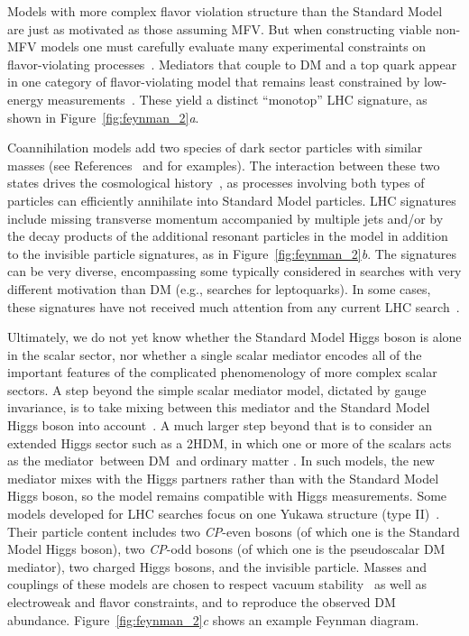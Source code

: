 \documentclass{ar-1col}
\newcommand{\IP}{invisible particle}
\begin{document}
{Models with more complex flavor violation structure than the Standard Model 
are just as motivated as those assuming MFV. 
But when constructing viable non-MFV models one must carefully evaluate 
many experimental constraints on flavor-violating processes~\cite{Blanke:2017tnb}. 
Mediators that couple to
DM and a top quark appear in one category of flavor-violating
model that remains least constrained by low-energy
measurements~\cite{Boucheneb:2014wza}. These yield a distinct
``monotop'' LHC signature, as shown in Figure~\ref{fig:feynman_2}\textit{a}.

{Coannihilation} models add two species of dark sector
particles with similar masses (see References~ and  for examples). 
The interaction between these two states drives the cosmological
history~\cite{Ellis:1999mm}, as processes involving both types of
particles can efficiently annihilate into Standard Model particles. LHC
signatures include missing transverse momentum accompanied by multiple jets
and/or by the decay products of the 
additional resonant particles in the model in addition to the invisible particle signatures,
as in Figure~\ref{fig:feynman_2}\textit{b}.
The signatures can be very diverse, encompassing some typically
considered in searches with very different motivation than DM (e.g., searches for
leptoquarks). In some cases, these signatures have not received much attention from any
current LHC search~\cite{Buschmann:2016hkc}.

Ultimately, we do not yet know whether the Standard Model Higgs boson is alone 
in the scalar sector, nor whether a single scalar mediator
encodes all of the important features of the complicated
phenomenology of more {complex scalar sectors}. 
A step beyond the simple scalar mediator model, dictated by gauge invariance, 
is to take mixing between this mediator and the Standard Model Higgs boson
into account~\cite{Bauer:2016gys,Berlin:2014cfa}. A much larger
step beyond that is to consider an extended Higgs sector such as a
2HDM, in which one or more of the scalars
acts as the mediator~between DM\ and ordinary matter \cite{Bauer:2017ota,Goncalves:2016iyg,Bell:2016ekl}. 
In such models, the new mediator mixes with the Higgs partners
rather than with the Standard Model Higgs boson, so the model remains
compatible with Higgs measurements. 
Some models developed for LHC searches focus on one Yukawa structure (type II)~\cite{Pich:2009sp}. 
Their particle content includes two \textit{CP}-even bosons (of which one is the Standard Model Higgs
boson), two \textit{CP}-odd bosons (of which one is the pseudoscalar DM
mediator), two charged Higgs bosons, and the \IP. Masses and
couplings of these models are chosen to respect vacuum
stability~\cite{Goncalves:2016iyg} as well as electroweak and flavor
constraints, and to reproduce the observed DM abundance. Figure~\ref{fig:feynman_2}\textit{c} shows an example Feynman diagram.

}
\end{document}
